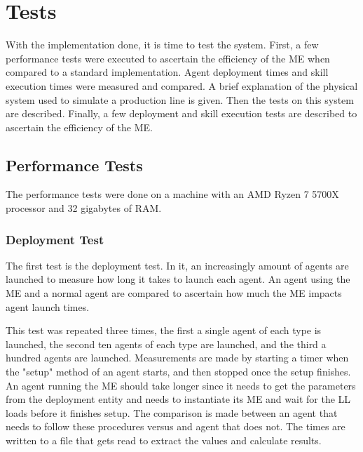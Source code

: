 


\chapter{Tests}
\label{cha:tests}

With the implementation done, it is time to test the system. First, a few performance tests were executed to ascertain the efficiency of the \acrlong{ME} when compared to a standard implementation. Agent deployment times and skill execution times were measured and compared. A brief explanation of the physical system used to simulate a production line is given. Then the tests on this system are described. Finally, a few deployment and skill execution tests are described to ascertain the efficiency of the \acrshort{ME}.

\section{Performance Tests}
\label{sec:performance_tests}

The performance tests were done on a machine with an AMD Ryzen 7 5700X processor and 32 gigabytes of RAM.

\subsection{Deployment Test}

The first test is the deployment test. In it, an increasingly amount of agents are launched to measure how long it takes to launch each agent. An agent using the \acrlong{ME} and a normal agent are compared to ascertain how much the \acrshort{ME} impacts agent launch times.

This test was repeated three times, the first a single agent of each type is launched, the second ten agents of each type are launched, and the third a hundred agents are launched. Measurements are made by starting a timer when the "setup" method of an agent starts, and then stopped once the setup finishes. An agent running the \acrlong{ME} should take longer since it needs to get the parameters from the deployment entity and needs to instantiate its \acrshort{ME} and wait for the \acrshort{LL} loads before it finishes setup. The comparison is made between an agent that needs to follow these procedures versus and agent that does not. The times are written to a file that gets read to extract the values and calculate results.

